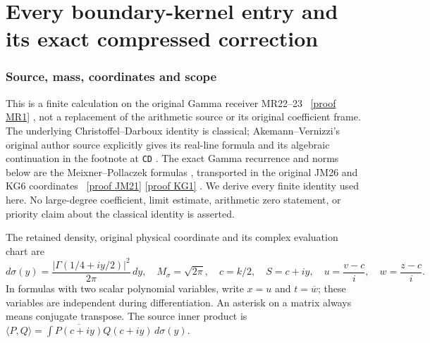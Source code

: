 

\clearpage\begingroup
\part*{Every boundary-kernel entry and its exact compressed correction}
\newcommand{\cdrootC}{\mathbb C}
\newcommand{\cdrootR}{\mathbb R}
\newcommand{\cdrootconj}[1]{\overline{#1}}


\section{Source, mass, coordinates and scope}

This is a finite calculation on the original Gamma receiver MR22--23
\cite{cdroot:MR}%
~\href{https://github.com/KokunoYumeto/zeta-function-research-reader/blob/5992ad50c0f2a06921f1fcaded7b4e38097c0739/workbenches/splitzero-tandem/continuations/20260920-original-kernel-mixed-determinants/ORIGINAL_KERNEL_MIXED_DETERMINANT.tex\#L36}{[proof MR1]}%
{}, not a replacement of the arithmetic source or its original
coefficient frame. The underlying Christoffel--Darboux identity is
classical; Akemann--Vernizzi's original author source explicitly gives
its real-line formula and its algebraic continuation in the footnote
at \texttt{CD} \cite{cdroot:AV}. The exact Gamma recurrence and norms below
are the Meixner--Pollaczek formulas \cite{cdroot:DLMF}, transported in the
original JM26 and KG6 coordinates \cite{cdroot:JM,cdroot:KG}%
~\href{https://github.com/KokunoYumeto/zeta-function-research-reader/blob/5992ad50c0f2a06921f1fcaded7b4e38097c0739/workbenches/splitzero-tandem/continuations/20260920-original-kernel-mixed-determinants/providers/JOINT_MINIMUM_RECEIVERS.tex\#L286}{[proof JM21]} \href{https://github.com/KokunoYumeto/zeta-function-research-reader/blob/5992ad50c0f2a06921f1fcaded7b4e38097c0739/workbenches/splitzero-tandem/continuations/20260920-original-kernel-mixed-determinants/providers/KERNEL_GAMMA_INDEPENDENT.tex\#L73}{[proof KG1]}%
{}. We derive every finite
identity used here. No large-degree coefficient, limit estimate,
arithmetic zero statement, or priority claim about the classical
identity is asserted.

The retained density, original physical coordinate and its complex
evaluation chart are
\begin{equation}\label{cdroot:eq:source}
 d\sigma(y)=\frac{|\Gamma(1/4+iy/2)|^2}{2\pi}\,dy,
 \quad M_\sigma=\sqrt{2\pi},\quad c=k/2,
 \quad S=c+iy,
 \quad u=\frac{v-c}{i},\quad w=\frac{z-c}{i}.
 \tag{CD1}
\end{equation}
In formulas with two scalar polynomial variables, write \(x=u\) and
\(t=\overline w\); these variables are independent during
differentiation. An asterisk on a matrix always means conjugate
transpose. The source inner product is
\(\langle P,Q\rangle=\int\overline{P(c+iy)}Q(c+iy)\,d\sigma(y)\).

